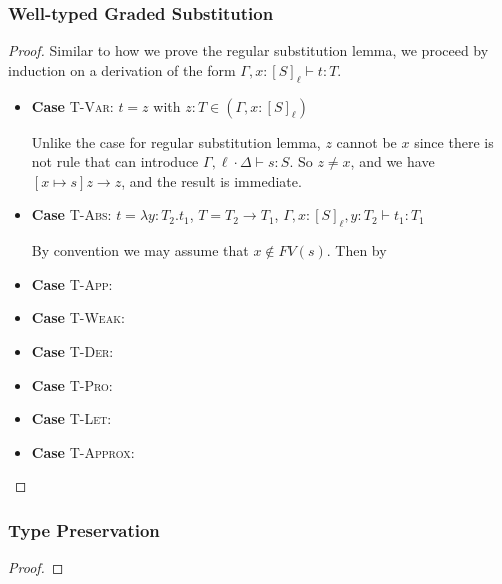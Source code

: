 \documentclass[conference]{IEEEtran}
\newcommand\lam[2]{\lambda #1.#2}
\begin{document}
\subsubsection{Well-typed Graded Substitution}
\begin{proof}
	Similar to how we prove the regular substitution lemma, we proceed by induction on a derivation of the form $\Gamma,x:[S]_\ell\vdash t:T$.
    \begin{itemize}
        \item \textbf{Case} \textsc{T-Var}: $t=z$ with $z:T\in(\Gamma,x:[S]_\ell)$
        
        Unlike the case for regular substitution lemma, $z$ cannot be $x$ since there is not rule that can introduce $\Gamma,\ell\cdot\Delta\vdash s:S$. So $z\ne x$, and we have $[x\mapsto s]z\to z$, and the result is immediate.
        \item \textbf{Case} \textsc{T-Abs}: $t=\lam{y:T_2}{t_1}$, $T=T_2\to T_1$, $\Gamma,x:[S]_\ell,y:T_2\vdash t_1:T_1$
        
        By convention we may assume that $x\notin FV(s)$. Then by
        \item \textbf{Case} \textsc{T-App}:
        \item \textbf{Case} \textsc{T-Weak}:
        \item \textbf{Case} \textsc{T-Der}:
        \item \textbf{Case} \textsc{T-Pro}:
        \item \textbf{Case} \textsc{T-Let}:
        \item \textbf{Case} \textsc{T-Approx}:
    \end{itemize}
\end{proof}

\subsubsection{Type Preservation}
\begin{proof}
	
\end{proof}
\end{document}
